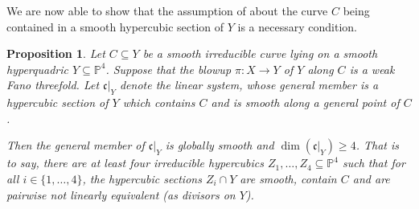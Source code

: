\documentclass[english,11pt,reqno]{amsart}
\newcommand{\sub}{\subseteq}
\newcommand{\Pfour}{\mathbb{P}^4}
\newcommand{\dd}{\mathfrak{c}}
\newtheorem{prop}[thm]{Proposition}
\begin{document}
%
%
We are now able to show that the assumption of  about the curve $C$ being contained in a smooth hypercubic section of $Y$ is a necessary condition. 
%
%
\begin{prop} \label{prop:weak_Fano_implies_contained_in_smooth_hypercubic_section}
Let $C \sub Y$ be a smooth irreducible curve lying on a smooth hyperquadric $Y\sub \Pfour$. Suppose that the blowup $\pi:X\rightarrow Y$  of $Y$ along $C$ is a weak Fano threefold. Let $\dd|_Y$ denote the linear system, whose general member is a hypercubic section of $Y$ which contains $C$ and is smooth along a general point of $C$. \par 
Then the general member of $\dd|_Y$ is globally smooth and $\dim(\dd|_Y)\geq 4$. That is to say, there are at least four irreducible hypercubics $Z_1,\dots, Z_4\sub \Pfour$ such that for all $i\in\{1,\dots,4\}$, the hypercubic sections $Z_i\cap Y$ are smooth, contain $C$ and are pairwise not linearly equivalent (as divisors on $Y$).
\end{prop}
%
%
\end{document}
